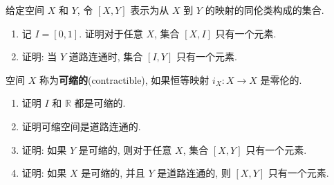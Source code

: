 \begin{exercise}
给定空间 $X$ 和 $Y$, 令 $[X,Y]$ 表示为从 $X$ 到 $Y$ 的映射的同伦类构成的集合.
\begin{enumerate}
\item 记 $I=[0,1]$. 证明对于任意 $X$, 集合 $[X,I]$ 只有一个元素.
\item 证明: 当 $Y$ 道路连通时, 集合 $[I,Y]$ 只有一个元素.
\end{enumerate}
\end{exercise}

\begin{exercise}
空间 $X$ 称为\textbf{可缩的}(contractible), 如果恒等映射 $i_X\colon X\to X$ 是零伦的.
\begin{enumerate}
\item 证明 $I$ 和 $\mathbb{R}$ 都是可缩的.
\item 证明可缩空间是道路连通的.
\item 证明: 如果 $Y$ 是可缩的, 则对于任意 $X$, 集合 $[X,Y]$ 只有一个元素.
\item 证明: 如果 $X$ 是可缩的, 并且 $Y$ 是道路连通的, 则 $[X,Y]$ 只有一个元素.
\end{enumerate}
\end{exercise}
